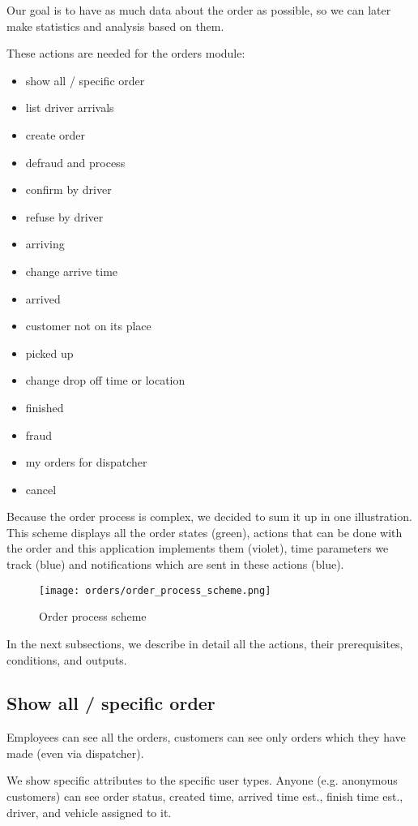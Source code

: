 		Our goal is to have as much data about the order as possible, so we can later make statistics and analysis based on them. 
		
		These actions are needed for the orders module:
		\begin{itemize}
			\item show all / specific order
			\item list driver arrivals
			\item create order
			\item defraud and process
			\item confirm by driver
			\item refuse by driver
			\item arriving
			\item change arrive time
			\item arrived
			\item customer not on its place
			\item picked up
			\item change drop off time or location
			\item finished
			\item fraud
			\item my orders for dispatcher
			\item cancel
		\end{itemize}
		
		Because the order process is complex, we decided to sum it up in one illustration. This scheme displays all the order states (green), actions that can be done with the order and this application implements them (violet), time parameters we track (blue) and notifications which are sent in these actions (blue).
		
		\begin{figure}[H]
			\centering
			\texttt{[image: orders/order\_process\_scheme.png]}
			\caption{Order process scheme}\label{order-process-scheme}
		\end{figure}
	
			In the next subsections, we describe in detail all the actions, their prerequisites, conditions, and outputs.
		
		\subsection{Show all / specific order}
			Employees can see all the orders, customers can see only orders which they have made (even via dispatcher).
			
			We show specific attributes to the specific user types. Anyone (e.g. anonymous customers) can see order status, created time, arrived time est., finish time est.,  driver, and vehicle assigned to it. 
			
